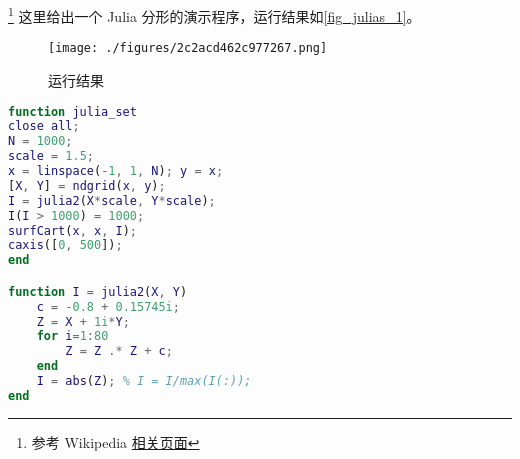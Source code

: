 
\begin{issues}
\issueDraft
\issueMissDepend
\end{issues}

\footnote{参考 Wikipedia \href{https://en.wikipedia.org/wiki/Julia_set}{相关页面}} 这里给出一个 Julia 分形的演示程序，运行结果如\autoref{fig_julias_1}。


\begin{figure}[ht]
\centering
\texttt{[image: ./figures/2c2acd462c977267.png]}
\caption{运行结果} \label{fig_julias_1}
\end{figure}

\begin{lstlisting}[language=matlab, caption=julia\_set.m]
function julia_set
close all;
N = 1000;
scale = 1.5;
x = linspace(-1, 1, N); y = x;
[X, Y] = ndgrid(x, y);
I = julia2(X*scale, Y*scale);
I(I > 1000) = 1000;
surfCart(x, x, I);
caxis([0, 500]);
end

function I = julia2(X, Y)
    c = -0.8 + 0.15745i;
    Z = X + 1i*Y;
    for i=1:80
        Z = Z .* Z + c;
    end
    I = abs(Z); % I = I/max(I(:));
end
\end{lstlisting}
